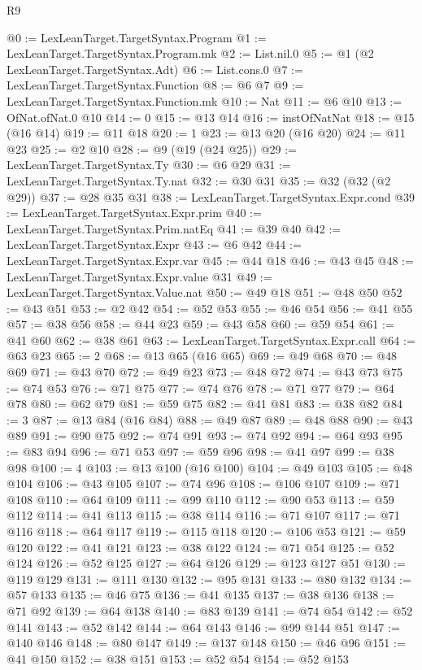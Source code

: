 \begin{lexlean}{R9}
\begin{coremodule}
@0 := LexLeanTarget.TargetSyntax.Program
@1 := LexLeanTarget.TargetSyntax.Program.mk
@2 := List.nil.{0}
@5 := @1 (@2 LexLeanTarget.TargetSyntax.Adt)
@6 := List.cons.{0}
@7 := LexLeanTarget.TargetSyntax.Function
@8 := @6 @7
@9 := LexLeanTarget.TargetSyntax.Function.mk
@10 := Nat
@11 := @6 @10
@13 := OfNat.ofNat.{0} @10
@14 := 0
@15 := @13 @14
@16 := instOfNatNat
@18 := @15 (@16 @14)
@19 := @11 @18
@20 := 1
@23 := @13 @20 (@16 @20)
@24 := @11 @23
@25 := @2 @10
@28 := @9 (@19 (@24 @25))
@29 := LexLeanTarget.TargetSyntax.Ty
@30 := @6 @29
@31 := LexLeanTarget.TargetSyntax.Ty.nat
@32 := @30 @31
@35 := @32 (@32 (@2 @29))
@37 := @28 @35 @31
@38 := LexLeanTarget.TargetSyntax.Expr.cond
@39 := LexLeanTarget.TargetSyntax.Expr.prim
@40 := LexLeanTarget.TargetSyntax.Prim.natEq
@41 := @39 @40
@42 := LexLeanTarget.TargetSyntax.Expr
@43 := @6 @42
@44 := LexLeanTarget.TargetSyntax.Expr.var
@45 := @44 @18
@46 := @43 @45
@48 := LexLeanTarget.TargetSyntax.Expr.value @31
@49 := LexLeanTarget.TargetSyntax.Value.nat
@50 := @49 @18
@51 := @48 @50
@52 := @43 @51
@53 := @2 @42
@54 := @52 @53
@55 := @46 @54
@56 := @41 @55
@57 := @38 @56
@58 := @44 @23
@59 := @43 @58
@60 := @59 @54
@61 := @41 @60
@62 := @38 @61
@63 := LexLeanTarget.TargetSyntax.Expr.call
@64 := @63 @23
@65 := 2
@68 := @13 @65 (@16 @65)
@69 := @49 @68
@70 := @48 @69
@71 := @43 @70
@72 := @49 @23
@73 := @48 @72
@74 := @43 @73
@75 := @74 @53
@76 := @71 @75
@77 := @74 @76
@78 := @71 @77
@79 := @64 @78
@80 := @62 @79
@81 := @59 @75
@82 := @41 @81
@83 := @38 @82
@84 := 3
@87 := @13 @84 (@16 @84)
@88 := @49 @87
@89 := @48 @88
@90 := @43 @89
@91 := @90 @75
@92 := @74 @91
@93 := @74 @92
@94 := @64 @93
@95 := @83 @94
@96 := @71 @53
@97 := @59 @96
@98 := @41 @97
@99 := @38 @98
@100 := 4
@103 := @13 @100 (@16 @100)
@104 := @49 @103
@105 := @48 @104
@106 := @43 @105
@107 := @74 @96
@108 := @106 @107
@109 := @71 @108
@110 := @64 @109
@111 := @99 @110
@112 := @90 @53
@113 := @59 @112
@114 := @41 @113
@115 := @38 @114
@116 := @71 @107
@117 := @71 @116
@118 := @64 @117
@119 := @115 @118
@120 := @106 @53
@121 := @59 @120
@122 := @41 @121
@123 := @38 @122
@124 := @71 @54
@125 := @52 @124
@126 := @52 @125
@127 := @64 @126
@129 := @123 @127 @51
@130 := @119 @129
@131 := @111 @130
@132 := @95 @131
@133 := @80 @132
@134 := @57 @133
@135 := @46 @75
@136 := @41 @135
@137 := @38 @136
@138 := @71 @92
@139 := @64 @138
@140 := @83 @139
@141 := @74 @54
@142 := @52 @141
@143 := @52 @142
@144 := @64 @143
@146 := @99 @144 @51
@147 := @140 @146
@148 := @80 @147
@149 := @137 @148
@150 := @46 @96
@151 := @41 @150
@152 := @38 @151
@153 := @52 @54
@154 := @52 @153

\end{coremodule}
\end{lexlean}
